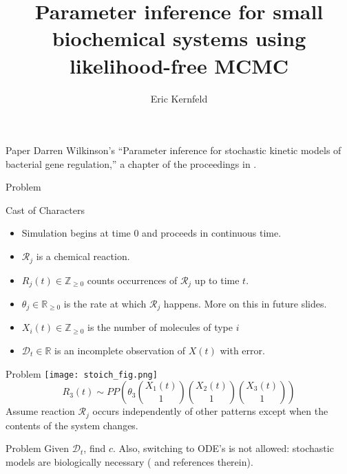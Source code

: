 \documentclass[12pt,a4paper,t,xcolor=dvipsnames,slidestop,compress,mathserif]{beamer}
\title[Likelihood-free MCMC]{Parameter inference for small biochemical systems using likelihood-free MCMC}
\author[Eric Kernfeld]{ {Eric Kernfeld}\inst{1}}
\institute[University of Washington]
{ \inst{1}%
University of Washington Department of Statistics}
\date{}
\begin{document}
\maketitle



\begin{frame}{Paper}
Darren Wilkinson's ``Parameter inference for stochastic kinetic models of bacterial gene regulation,'' a chapter of the proceedings in \cite{Bernardo2012}.

\end{frame}

\begin{frame}{Problem}

Cast of Characters 
\begin{itemize}
\item Simulation begins at time $0$ and proceeds in continuous time.
\item $\mathcal{R}_j$ is a chemical reaction.
\item $R_j(t) \in \mathbb{Z}_{\geq 0}$ counts occurrences of $\mathcal{R}_j$ up to time $t$.
\item $\theta_j\in \mathbb{R}_{\geq 0}$ is the rate at which $\mathcal{R}_j$ happens. More on this in future slides.
\item $X_i(t)  \in \mathbb{Z}_{\geq 0}$ is the number of molecules of type $i$
\item $\mathcal{D}_t \in \mathbb{R}$ is an incomplete observation of $X(t)$ with error.
\end{itemize}

\end{frame}
\begin{frame}{Problem}
\texttt{[image: stoich\_fig.png]}
$$R_3(t)\sim PP(\theta_3{X_1(t)\choose1}{X_2(t)\choose1}{X_3(t)\choose1})$$
Assume reaction $\mathcal{R}_j$ occurs independently of other patterns except when the contents of the system changes.
\end{frame}
\begin{frame}{Problem}
Given $\mathcal{D}_t$, find $c$. 
\pause
Also, switching to ODE's is not allowed: stochastic models are biologically necessary (\cite{reinker2006parameter} and references therein).
\end{frame}
\end{document}
